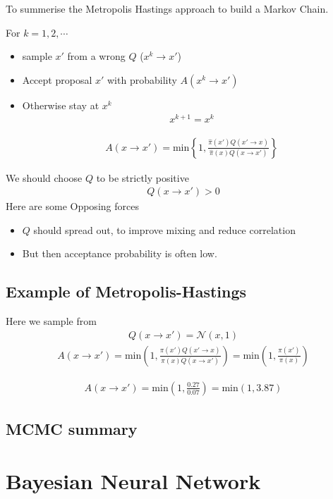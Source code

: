 \documentclass[11pt, oneside, reqno]{amsart}
\numberwithin{equation}{section}
\theoremstyle{plain}%
\theoremstyle{definition}
\theoremstyle{remark}
\begin{document}
To summerise the Metropolis Hastings approach to build a Markov Chain.

For $k=1,2,\cdots$
\begin{itemize}
	\item sample $x'$ from a {\color{red}wrong} $Q$ ($x^k\to x'$)
	\item Accept proposal $x'$ with probability $A(x^k\to x')$
	\item Otherwise stay at $x^k$
	\begin{align*}
		x^{k+1}=x^k
	\end{align*}

\begin{align*}
	A(x\to x')=\text{min}\left\{1,\frac{\hat{\pi}(x')Q(x'\to x)}{\hat{\pi}(x)Q(x\to x')}\right\}
\end{align*}
\end{itemize}
We should choose $Q$ to be strictly positive 
\begin{align*}
	Q(x\to x')>0
\end{align*}
Here are some {\color{red}Opposing forces}
\begin{itemize}
	\item $Q$ should spread out, to improve mixing and reduce correlation
	\item But then acceptance probability is often low.
\end{itemize}
\subsection{Example of Metropolis-Hastings}
Here we sample from 
\begin{align*}
	Q(x\to x')=\mathcal{N}(x,1)
\end{align*}
\begin{align*}
	A(x\to x')=\text{min}\left(1,\frac{\pi(x')Q(x'\to x)}{\pi(x)Q(x\to x')}\right)
	=\text{min}\left(1,\frac{\pi(x')}{\pi(x)}\right)
\end{align*}

\begin{align*}
	A(x\to x')=\text{min}\left(1,\frac{0.27}{0.07}\right)=\text{min}(1,3.87)
\end{align*}
\subsection{MCMC summary}
\section{Bayesian Neural Network}
 
\end{document}
